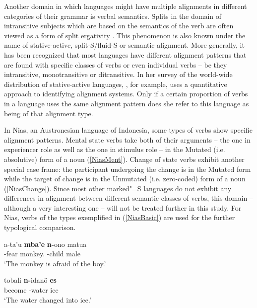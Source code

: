 Another domain in which languages might have multiple alignments in different categories of their grammar is verbal semantics. 
Splits in the domain of intransitive subjects which are based on the semantics of the verb are often viewed as a form of split ergativity \citep[70 ff.]{Dixon:1994}.
This phenomenon is also known under the name of stative-active, split-S/fluid-S or semantic alignment.
More generally, it has been recognized that most languages have different alignment patterns that are found with specific classes of verbs or even individual verbs -- be they intransitive, monotransitive or ditransitive. 
In her survey of the world-wide distribution of stative-active languages, \citet{Nichols:2008}, for example, uses a quantitative approach to identifying alignment systems. 
Only if a certain proportion of verbs in a language uses the same alignment pattern does she refer to this language as being of that alignment type.

In Nias, an Austronesian language of Indonesia, some types of verbs show specific alignment patterns. 
Mental state verbs take both of their arguments -- the one in experiencer role as well as the one in stimulus role -- in the Mutated (i.e. absolutive) form of a noun (\ref{NiasMent}). 
Change of state verbs exhibit another special case frame: the participant undergoing the change is in the Mutated form while the target of change is in the Unmutated (i.e. zero-coded) form of a noun (\ref{NiasChange}). 
Since most other marked"=S languages do not exhibit any differences in alignment between different semantic classes of verbs, this domain -- although a very interesting one -- will not be treated further in this study. 
For Nias, verbs of the types exemplified in (\ref{NiasBasic}) are used for the further typological comparison.


\begin{exe}
\ex {}
\begin{xlist}
\ex\label{NiasMent}\gll a-ta'u \textbf{mba'e} \textbf{n-}ono matua\\
\stat{}-fear monkey.\mut{} \mut{}-child male\\
\glt `The monkey is afraid of the boy.'

\ex\label{NiasChange}\gll  tobali \textbf{n-}idan\"o \textbf{es}\\
become \mut{}-water ice\\
\glt `The water changed into ice.'
\end{xlist}
\end{exe}

